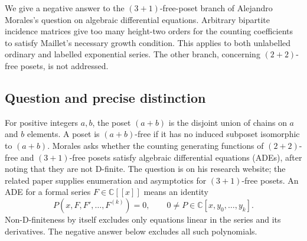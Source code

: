 \documentclass[11pt,a4paper]{article}
\numberwithin{equation}{section}
\theoremstyle{definition}
\theoremstyle{remark}
\newenvironment{sectionabstract}{\par\smallskip\begingroup\small\noindent}{\par\endgroup\medskip}
\begin{document}
\begin{sectionabstract}
We give a negative answer to the $(3+1)$-free-poset branch of
Alejandro Morales's question on algebraic differential equations.
Arbitrary bipartite incidence matrices give too many height-two
orders for the counting coefficients to satisfy Maillet's necessary
growth condition. This applies to both unlabelled ordinary and labelled
exponential series. The other branch, concerning $(2+2)$-free posets,
is not addressed.
\end{sectionabstract}

\subsection*{Question and precise distinction}
For positive integers $a,b$, the poset $(a+b)$ is the disjoint
union of chains on $a$ and $b$ elements. A poset is $(a+b)$-free if
it has no induced subposet isomorphic to $(a+b)$.
Morales \cite{r44taisho:M} asks whether the counting generating functions of
$(2+2)$-free and $(3+1)$-free posets satisfy algebraic differential
equations (ADEs), after noting that they are not D-finite. The
question is on his research website; the related paper \cite{r44taisho:GMR}
supplies enumeration and asymptotics for $(3+1)$-free posets.
An ADE for a formal series $F\in\mathbb C[[x]]$ means an identity
\[
 P(x,F,F',\ldots,F^{(k)})=0,\qquad
 0\ne P\in\mathbb C[x,y_0,\ldots,y_k].
\]
Non-D-finiteness by itself excludes only equations linear in the
series and its derivatives. The negative answer below excludes all
such polynomials.
\end{document}
